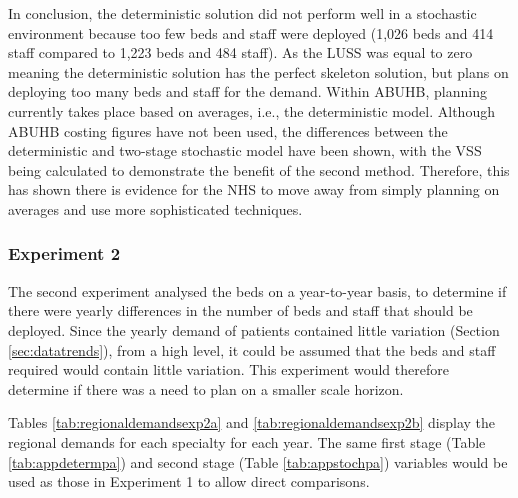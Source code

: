 \documentclass[../thesis.tex]{subfiles}
\begin{document}
In conclusion, the deterministic solution did not perform well in a stochastic environment because too few beds and staff were deployed (1,026 beds and 414 staff compared to 1,223 beds and 484 staff). As the LUSS was equal to zero meaning the deterministic solution has the perfect skeleton solution, but plans on deploying too many beds and staff for the demand. Within ABUHB, planning currently takes place based on averages, i.e., the deterministic model. Although ABUHB costing figures have not been used, the differences between the deterministic and two-stage stochastic model have been shown, with the VSS being calculated to demonstrate the benefit of the second method. Therefore, this has shown there is evidence for the NHS to move away from simply planning on averages and use more sophisticated techniques. 


\subsubsection{Experiment 2}
The second experiment analysed the beds on a year-to-year basis, to determine if there were yearly differences in the number of beds and staff that should be deployed. Since the yearly demand of patients contained little variation (Section \ref{sec:datatrends}), from a high level, it could be assumed that the beds and staff required would contain little variation. This experiment would therefore determine if there was a need to plan on a smaller scale horizon. 

Tables \ref{tab:regionaldemandsexp2a} and \ref{tab:regionaldemandsexp2b} display the regional demands for each specialty for each year. The same first stage (Table \ref{tab:appdetermpa}) and second stage (Table \ref{tab:appstochpa}) variables would be used as those in Experiment 1 to allow direct comparisons.
\end{document}
